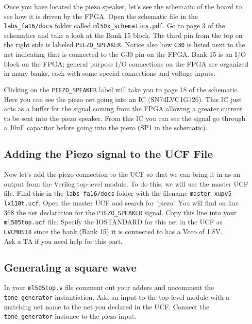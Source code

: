 \documentclass[11pt]{article}
\begin{document}
Once you have located the piezo speaker, let's see the schematic of the board to see how it is driven by the FPGA. Open the schematic file in the \verb|labs_fa16/docs| folder called \verb|ml50x_schematics.pdf|. Go to page 3 of the schematics and take a look at the Bank 15 block. The third pin from the top on the right side is labeled \verb|PIEZO_SPEAKER|. Notice also how \verb|G30| is listed next to the net indicating that is connected to the G30 pin on the FPGA. Bank 15 is an I/O block on the FPGA; general purpose I/O connections on the FPGA are organized in many banks, each with some special connections and voltage inputs.

Clicking on the \verb|PIEZO_SPEAKER| label will take you to page 18 of the schematic. Here you can see the piezo net going into an IC (SN74LVC1G126). This IC just acts as a buffer for the signal coming from the FPGA allowing a greater current to be sent into the piezo speaker. From this IC you can see the signal go through a 10uF capacitor before going into the piezo (SP1 in the schematic).

\subsection{Adding the Piezo signal to the UCF File}
Now let's add the piezo connection to the UCF so that we can bring it in as an output from the Verilog top-level module. To do this, we will use the master UCF file. Find this in the \verb|labs_fa16/docs| folder with the filename \verb|master_xupv5-lx110t.ucf|. Open the master UCF and search for 'piezo'. You will find on line 368 the net declaration for the \verb|PIEZO_SPEAKER| signal. Copy this line into your \verb|ml505top.ucf| file. Specify the IOSTANDARD for this net in the UCF as \verb|LVCMOS18| since the bank (Bank 15) it is connected to has a Vcco of 1.8V.\\

Ask a TA if you need help for this part.

\subsection{Generating a square wave}
In your \verb|ml505top.v| file comment out your adders and uncomment the \verb|tone_generator| instantiation. Add an input to the top-level module with a matching net name to the net you declared in the UCF. Connect the \verb|tone_generator| instance to the piezo input.\\
\end{document}
